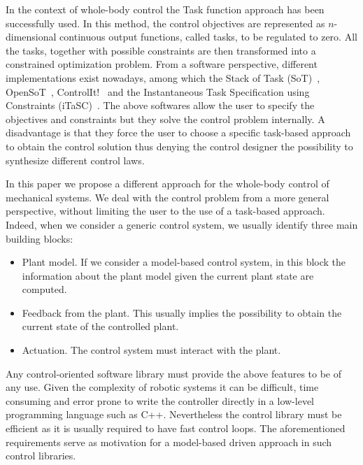 In the context of whole-body control the Task function approach \cite{Samson1991} has been successfully used. 
In this method, the control objectives are represented as $n$-dimensional continuous output functions, called tasks, to be regulated to zero.
All the tasks, together with possible constraints are then transformed into a constrained optimization problem. %
From a software perspective, different implementations exist nowadays, among which the Stack of Task (SoT)~\cite{Mansard2009}, OpenSoT~\cite{rocchi2015opensot}, ControlIt!~ \cite{fok2016controlit} and the Instantaneous Task Specification using Constraints (iTaSC)~\cite{DeSchutter2007}.
The above softwares allow the user to specify the objectives and constraints but they solve the control problem internally. 
A disadvantage is that they force the user to choose a specific task-based approach to obtain the control solution thus denying the control designer the possibility to synthesize different control laws.

In this paper we propose a different approach for the whole-body control of mechanical systems.
We deal with the control problem from a more general perspective, without limiting the user to the use of a task-based approach.
Indeed, when we consider a generic control system, we usually identify three main building blocks:
\begin{itemize}
    \item Plant model. If we consider a model-based control system, in this block the information about the plant model given the current plant state are computed.
    \item Feedback from the plant. This usually implies the possibility to obtain the current state of the controlled plant.
    \item Actuation. The control system must interact with the plant.
\end{itemize}
Any control-oriented software library must provide the above features to be of any use.
Given the complexity of robotic systems it can be difficult, time consuming and error prone to write the controller directly in a low-level programming language such as C++. 
Nevertheless the control library must be efficient as it is usually required to have fast control loops. 
The aforementioned requirements serve as motivation for a model-based driven approach in such control libraries.

